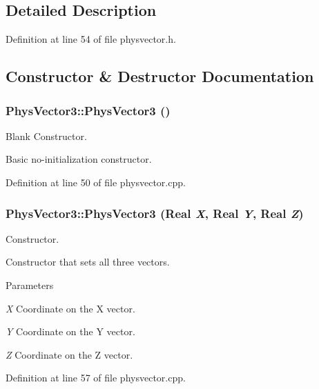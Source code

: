 \subsection{Detailed Description}


Definition at line 54 of file physvector.h.



\subsection{Constructor \& Destructor Documentation}
\hypertarget{classPhysVector3_a0d68895a6479ed7f875f666ce381afba}{
\subsubsection[{PhysVector3}]{\setlength{\rightskip}{0pt plus 5cm}PhysVector3::PhysVector3 ()}}
\label{da/d11/classPhysVector3_a0d68895a6479ed7f875f666ce381afba}


Blank Constructor. 

Basic no-\/initialization constructor. 

Definition at line 50 of file physvector.cpp.

\hypertarget{classPhysVector3_a0fd6687cacb095a14a398fd88a33d76a}{
\subsubsection[{PhysVector3}]{\setlength{\rightskip}{0pt plus 5cm}PhysVector3::PhysVector3 (Real {\em X}, \/  Real {\em Y}, \/  Real {\em Z})}}
\label{da/d11/classPhysVector3_a0fd6687cacb095a14a398fd88a33d76a}


Constructor. 

Constructor that sets all three vectors. 
\begin{DoxyParams}{Parameters}
\item[{\em X}]Coordinate on the X vector. \item[{\em Y}]Coordinate on the Y vector. \item[{\em Z}]Coordinate on the Z vector. \end{DoxyParams}


Definition at line 57 of file physvector.cpp.



